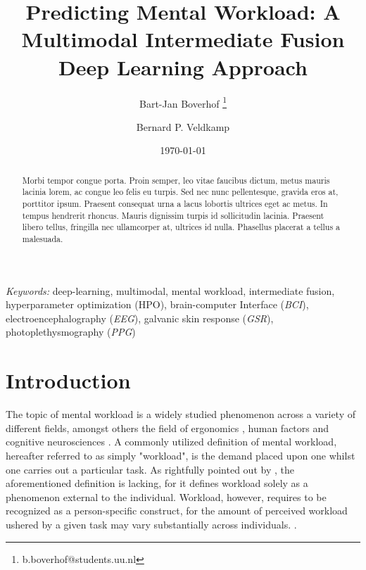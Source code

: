 \documentclass[12pt]{article}
\title{Predicting  Mental Workload: A Multimodal Intermediate Fusion Deep Learning Approach}
\author[1]{Bart-Jan Boverhof \thanks{b.boverhof@students.uu.nl}}
\author[2]{Bernard P. Veldkamp}
\affil[1]{\normalsize Faculty of Social and Behavioural Sciences, Utrecht University}
\affil[2]{\normalsize Faculty of Behavioral, Management and Social Sciences, University of Twente}
\date{\today}
\begin{document}
\maketitle
\thispagestyle{empty}

\begin{abstract}
Morbi tempor congue porta. Proin semper, leo vitae faucibus dictum, metus mauris lacinia lorem, ac congue leo felis eu turpis. Sed nec nunc pellentesque, gravida eros at, porttitor ipsum. Praesent consequat urna a lacus lobortis ultrices eget ac metus. In tempus hendrerit rhoncus. Mauris dignissim turpis id sollicitudin lacinia. Praesent libero tellus, fringilla nec ullamcorper at, ultrices id nulla. Phasellus placerat a tellus a malesuada.
\end{abstract}

\vspace{1cm}
\hfill\begin{minipage}{\dimexpr\textwidth-1cm}
\textit{Keywords:} deep-learning, multimodal, mental workload, intermediate fusion, hyperparameter optimization (HPO), brain-computer Interface (\textit{BCI}),  electroencephalography (\textit{EEG}), galvanic skin response (\textit{GSR}), photoplethysmography (\textit{PPG})
\end{minipage}

\newpage
\section{Introduction}
The topic of mental workload is a widely studied phenomenon across a variety of different fields, amongst others the field of ergonomics \cite{young2015state}, human factors \cite{pretorius2007development} and cognitive neurosciences \cite{shuggi2017mental}. A commonly utilized definition of mental workload, hereafter referred to as simply "workload", is the demand placed upon one whilst one carries out a particular task. As rightfully pointed out by , the aforementioned definition is lacking, for it defines workload solely as a phenomenon external to the individual. Workload, however, requires to be recognized as a person-specific construct, for the amount of perceived workload ushered by a given task may vary substantially across individuals. \cite{de1996measurement}. 
\end{document}
